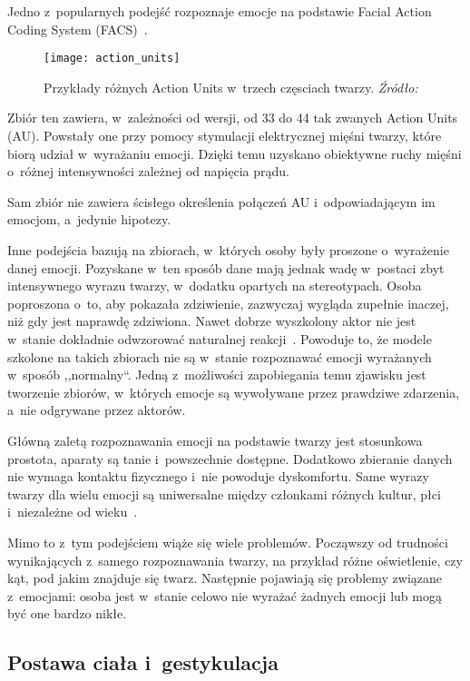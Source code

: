 Jedno z~popularnych podejść rozpoznaje emocje na podstawie Facial Action Coding System (FACS)~\cite{Ekman1978}.

\begin{figure}[h]
    \centering
    \texttt{[image: action\_units]}
    \caption{Przykłady różnych Action Units w~trzech częsciach twarzy. \textit{Źródło:~\cite{Ko2018}}}
    \label{fig:action-units}
\end{figure}

Zbiór ten zawiera, w~zależności od wersji, od 33 do 44 tak zwanych Action Units (AU).
Powstały one przy pomocy stymulacji elektrycznej mięśni twarzy, które biorą udział w~wyrażaniu emocji.
Dzięki temu uzyskano obiektywne ruchy mięśni o~różnej intensywności zależnej od napięcia prądu.

Sam zbiór nie zawiera ścisłego określenia połączeń AU i~odpowiadającym im emocjom, a~jedynie hipotezy.

Inne podejścia bazują na zbiorach, w~których osoby były proszone o~wyrażenie danej emocji.
Pozyskane w~ten sposób dane mają jednak wadę w~postaci zbyt intensywnego wyrazu twarzy, w~dodatku opartych na stereotypach.
Osoba poproszona o~to, aby pokazała zdziwienie, zazwyczaj wygląda zupełnie inaczej, niż gdy jest naprawdę zdziwiona.
Nawet dobrze wyszkolony aktor nie jest w~stanie dokładnie odwzorować naturalnej reakcji~\cite{Calvo2015}.
Powoduje to, że modele szkolone na takich zbiorach nie są w~stanie rozpoznawać emocji wyrażanych w~sposób ,,normalny``.
Jedną z~możliwości zapobiegania temu zjawisku jest tworzenie zbiorów, w~których emocje są wywoływane przez prawdziwe zdarzenia, a~nie odgrywane przez aktorów.

Główną zaletą rozpoznawania emocji na podstawie twarzy jest stosunkowa prostota, aparaty są tanie i~powszechnie dostępne.
Dodatkowo zbieranie danych nie wymaga kontaktu fizycznego i~nie powoduje dyskomfortu.
Same wyrazy twarzy dla wielu emocji są uniwersalne między członkami różnych kultur, płci i~niezależne od wieku~\cite{Calvo2015}.

Mimo to z~tym podejściem wiąże się wiele problemów.
Począwszy od trudności wynikających z~samego rozpoznawania twarzy, na przykład różne oświetlenie, czy kąt, pod jakim znajduje się twarz.
Następnie pojawiają się problemy związane z~emocjami: osoba jest w~stanie celowo nie wyrażać żadnych emocji lub mogą być one bardzo nikłe.


\subsection{Postawa ciała i~gestykulacja}\label{subsec:postawa-ciaa-i-gestykulacja}

